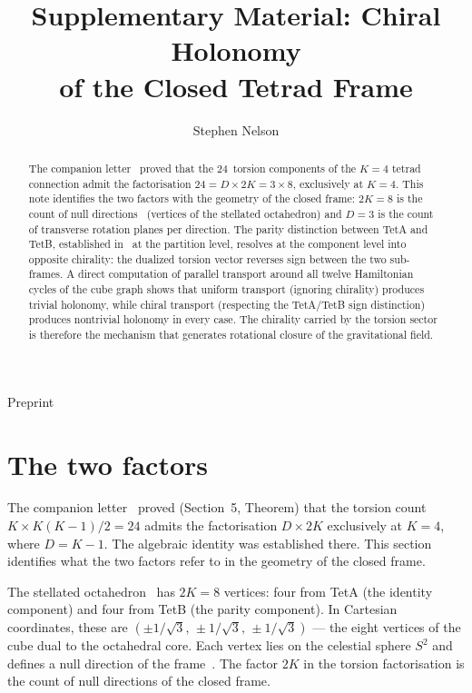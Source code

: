 \documentclass[twocolumn]{iopjournal}
\renewcommand{\articletype}[1]{%
  {\vspace*{-8mm}\noindent \Large \sf Preprint}\par
  \vspace*{6mm}\noindent{\scriptsize \sf{\bfseries \MakeUppercase{#1}}}}
\begin{document}
\articletype{Supplementary Material}

\title{Supplementary Material: Chiral Holonomy\\
of the Closed Tetrad Frame}

\author{Stephen Nelson}



\begin{abstract}
The companion letter~\cite{Nelson2026b} proved that the
24~torsion components of the $K = 4$ tetrad connection
admit the factorisation $24 = D \times 2K = 3 \times 8$,
exclusively at $K = 4$.  This note identifies the two
factors with the geometry of the closed frame: $2K = 8$
is the count of null directions~\cite{Nelson2026a}
(vertices of the stellated octahedron) and $D = 3$ is
the count of transverse rotation planes per direction.  The parity
distinction between TetA and TetB, established
in~\cite{Nelson2026b} at the partition level, resolves at
the component level into opposite chirality: the
dualized torsion vector reverses sign between the two
sub-frames.  A direct computation of parallel transport
around all twelve Hamiltonian cycles of the cube graph
shows that uniform transport (ignoring chirality)
produces trivial holonomy, while chiral transport
(respecting the TetA/TetB sign distinction) produces
nontrivial holonomy in every case.  The chirality
carried by the torsion sector is therefore the mechanism
that generates rotational closure of the gravitational
field.
\end{abstract}


\section*{The two factors}

The companion letter~\cite{Nelson2026b} proved
(Section~5, Theorem) that the torsion count
$K \times K(K{-}1)/2 = 24$ admits the factorisation
$D \times 2K$ exclusively at $K = 4$, where $D = K - 1$.
The algebraic identity was established there.  This
section identifies what the two factors refer to in the
geometry of the closed frame.

The stellated octahedron~\cite{Nelson2026a} has
$2K = 8$ vertices: four from TetA (the identity
component) and four from TetB (the parity component).
In Cartesian coordinates, these are
$(\pm 1/\sqrt{3},\, \pm 1/\sqrt{3},\, \pm 1/\sqrt{3})$
--- the eight vertices of the cube dual to the
octahedral core.  Each vertex lies on the celestial
sphere $S^2$ and defines a null direction of the
frame~\cite{Nelson2026a}.
The factor $2K$ in the torsion factorisation is the
count of null directions of the closed frame.
\end{document}
